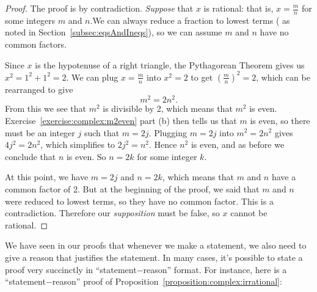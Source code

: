 \begin{proof}
The proof is by contradiction.   \emph{Suppose} that $x$ is rational: that is, $x = \frac{m}{n}$ for some integers $m$ and $n$.We can always reduce a fraction to lowest terms ( as noted in Section~\ref{subsec:eqsAndIneqs}), so we can assume $m$ and $n$ have no common factors. 

Since $x$ is the hypotenuse of a right triangle, the Pythagorean Theorem gives us $x^2 = 1^2 + 1^2 = 2$.
We can plug $x=\frac{m}{n}$ into $x^2 = 2$ to get $\left(\frac{m}{n}\right) ^2 = 2$, which can be rearranged to give 
\[ m^2 = 2n^2.\]
From this we see that $m^2$  is divisible by 2, which means that $m^2$ is even. Exercise~\ref{exercise:complex:m2even} part (b) then tells us that $m$ is even, so there must be an integer $j$ such that  $m = 2j$.  Plugging $m=2j$ into $m^2=2n^2$  gives $4j^2 = 2n^2$, which simplifies to $2j^2 = n^2$.  Hence $ n^2$ is even, and as before we conclude that $n$ is even.  So $n = 2k$ for some integer $k$.

At this point, we have $m = 2j$ and $n = 2k$, which means that $m$ and $n$ have a common factor of 2.  But at the beginning of the proof, we said that  $m$ and $n$ were reduced to lowest terms, so they  have no common factor.  This is a contradiction.  Therefore our \emph{supposition} must be false, so $x$ cannot be rational.
\end{proof}

We have seen in our proofs that whenever we make a statement, we also need to give a reason that justifies the statement. In many cases, it's possible to state a proof very succinctly in  ``statement$-$reason'' format. For instance, here is a ``statement$-$reason'' proof of Proposition~\ref{proposition:complex:irrational}:

